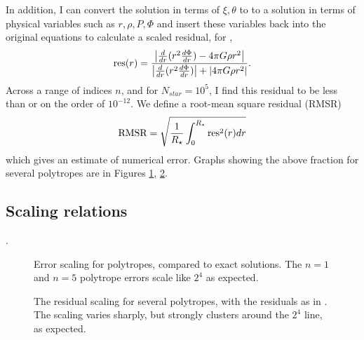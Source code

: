 In addition, I can convert the solution in terms of 
$\xi,\theta$ to   to a solution in terms of physical variables such as $r, \rho, P, \Phi$ and insert 
these variables back into the original equations  to calculate a scaled residual, \eg for 
,
\begin{equation}\label{eq:Residual}
 \mathrm{res}(r) = \frac{\left\vert  \frac{d}{dr}(r^2\frac{d\Phi}{dr})  - 4\pi G \rho r^2   \right\vert}
 		{\left\vert \frac{d}{dr}(r^2\frac{d\Phi}{dr}) \right\vert+\left\vert 4\pi G\rho r^2 \right\vert}.
\end{equation}
Across a range of indices $n$, and for $N_{star}=10^5$, I find this residual to be less than or on the order of $10^{-12}$.
We define a root-mean square residual (RMSR)
\begin{equation}\label{eq:RMSR}
	\text{RMSR} = \sqrt{\frac{1}{{R_\star}}\int_0^{R_\star} \text{res}^2(r) dr}
\end{equation}
which gives an estimate of numerical error.  Graphs showing the above fraction for several polytropes are in Figures \ref{fig:chapter2:scalepolyexact}, \ref{fig:chapter2:scalepolyresid}.

\begin{figure*}
	\resizebox{\linewidth}{!}{}
	\caption[Residual in Lane-Emden polytrope code]{
	The residual for several numerical models of polytrope, as in , following .
	\label{fig:chapter2:polyresid}}
\end{figure*}

\subsection{Scaling relations}\label{subsec:chapter2:code3}
\lipsum[1].  

\begin{figure}
	\resizebox{\linewidth}{!}{}
	\caption[Exact error scaling in polytrope code]{Error scaling for polytropes, compared to exact solutions.  The $n=1$ and $n=5$ polytrope errors scale like $2^4$ as expected. 
	\label{fig:chapter2:scalepolyexact}}
\end{figure}
\begin{figure}
	\resizebox{\linewidth}{!}{}
	\caption[Residual scaling in polytrope code]{The residual scaling for several polytropes, with the residuals as in .  The scaling varies sharply, but strongly clusters around the $2^4$ line, as expected.\label{fig:chapter2:scalepolyresid}}
\end{figure}

